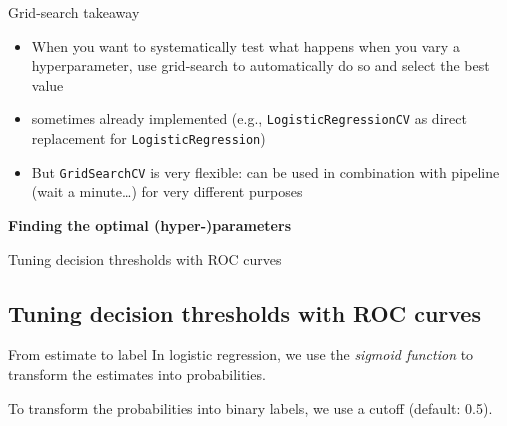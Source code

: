 \documentclass{beamer}
\begin{document}
\begin{frame}{Grid-search takeaway}
\begin{itemize}[<+->]
	\item When you want to systematically test what happens when you vary a hyperparameter, use grid-search to automatically do so and select the best value
	\item sometimes already implemented (e.g., \texttt{LogisticRegressionCV} as direct replacement for \texttt{LogisticRegression})
	\item But \texttt{GridSearchCV} is very flexible: can be used in combination with pipeline (wait a minute\ldots) for very different purposes
\end{itemize}


\end{frame}



\begin{frame}[plain]
\textbf{Finding the optimal (hyper-)parameters}

Tuning decision thresholds with ROC curves
\end{frame}

\subsection{Tuning decision thresholds with ROC curves}

\begin{frame}{From estimate to label}
In logistic regression, we use the \textit{sigmoid function} to transform the estimates into probabilities.

To transform the probabilities into binary labels, we use a cutoff (default: 0.5).
\end{frame}
\end{document}
